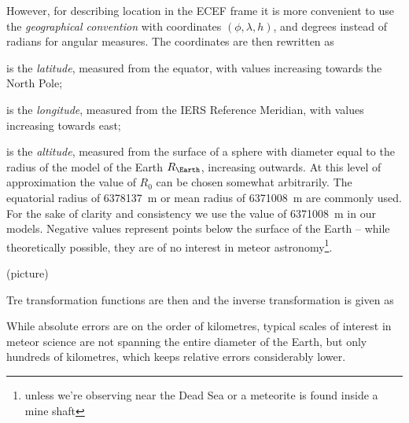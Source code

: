         However, for describing location in the ECEF frame it is more convenient
        to use the \emph{geographical convention} with coordinates $(\phi, \lambda, h)$, and degrees
        instead of radians for angular measures. The coordinates are then rewritten as
        \begin{description}[leftmargin=40mm]
            \item[$\phi \in \IntervalCC{\ang{-90}}{\ang{+90}}$] is the \emph{latitude}, measured from the equator,
                with values increasing towards the North Pole;
            \item[$\lambda \in \IntervalCC{\ang{-180}}{\ang{+180}}$] is the \emph{longitude}, measured from the IERS Reference Meridian,
                with values increasing towards east;
            \item[$h \in \IntervalCC{-R_\Earth}{\infty}$] is the \emph{altitude}, measured from the surface of
                a sphere with diameter equal to the radius of the model of the Earth $R_\Earth$, increasing outwards.
                At this level of approximation the value of $R_0$ can be chosen somewhat arbitrarily.
                The equatorial radius of \SI{6378137}{\metre} or mean radius of \SI{6371008}{\metre} are commonly used.
                For the sake of clarity and consistency we use the value of \SI{6371008}{\metre} in our models.
                Negative values represent points below the surface of the Earth --
                while theoretically possible, they are of no interest in meteor
                astronomy\footnote{unless we're observing near the Dead Sea or a meteorite is found inside a mine shaft}.
        \end{description}

        (picture)

        Tre transformation functions are then
        and the inverse transformation is given as

        While absolute errors are on the order of kilometres, typical scales of interest
        in meteor science are not spanning the entire diameter of the Earth,
        but only hundreds of kilometres, which keeps relative errors considerably lower.

